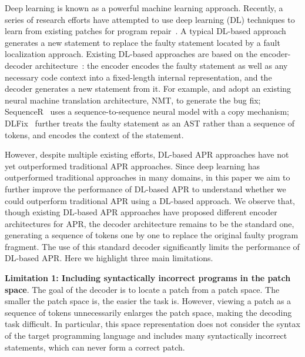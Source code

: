 Deep learning is known as a powerful machine learning approach. Recently, a series of research efforts have attempted to use deep learning (DL) techniques to learn from existing patches for program repair~\citep{8827954,DBLP:journals/corr/abs-1812-07170,9000077,dlfix}. A typical DL-based approach generates a new statement to replace the faulty statement located by a fault localization approach. Existing DL-based approaches are based on the encoder-decoder architecture~\cite{Bahdanau2015NeuralMT}: the encoder encodes the faulty statement as well as any necessary code context into a fixed-length internal representation, and the decoder generates a new statement from it. For example, \citet{DBLP:journals/corr/abs-1812-07170} and \citet{9000077} adopt an existing neural machine translation architecture, NMT, to generate the bug fix; SequenceR~\cite{8827954} uses a sequence-to-sequence neural model with a copy mechanism; DLFix~\citep{dlfix} further treats the faulty statement as an AST rather than a sequence of tokens, and encodes the context of the statement. 

However, despite multiple existing efforts, DL-based APR approaches have not yet outperformed traditional APR approaches. Since deep learning has outperformed traditional approaches in many domains, in this paper we aim to further improve the performance of DL-based APR to understand whether we could outperform traditional APR using a DL-based approach. We observe that, though existing DL-based APR approaches have proposed different encoder architectures for APR, the decoder architecture remains to be the standard one, generating a sequence of tokens one by one to replace the original faulty program fragment. The use of this standard decoder significantly limits the performance of DL-based APR. Here we highlight three main limitations.

{\bf Limitation 1: Including syntactically incorrect programs in the patch space}. The goal of the decoder is to locate a patch from a patch space. The smaller the patch space is, the easier the task is. However, viewing a patch as a sequence of tokens unnecessarily enlarges the patch space, making the decoding task difficult. In particular, this space representation does not consider the syntax of the target programming language and includes many syntactically incorrect statements, which can never form a correct patch. 

